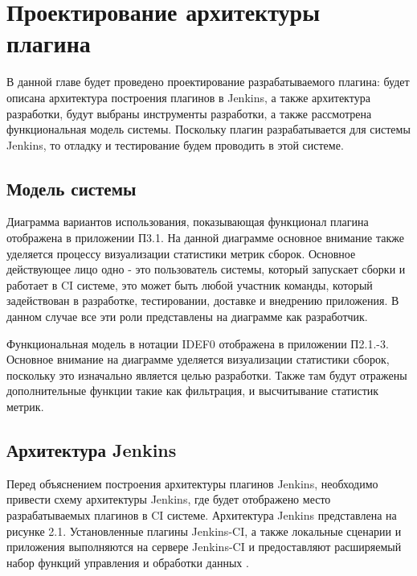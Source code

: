 \chapter{Проектирование архитектуры плагина} \label{ch2}
	
В данной главе будет проведено проектирование разрабатываемого плагина: будет описана архитектура построения плагинов в Jenkins, а также архитектура разработки, будут выбраны инструменты разработки, а также рассмотрена функциональная модель системы. Поскольку плагин разрабатывается для системы Jenkins, то отладку и тестирование будем проводить в этой системе.

\section{Модель системы} \label{ch1:sec1}

Диаграмма вариантов использования, показывающая функционал плагина отображена в приложении П3.1. На данной диаграмме основное внимание также уделяется процессу визуализации статистики метрик сборок. Основное действующее лицо одно - это пользователь системы, который запускает сборки и работает в CI системе, это может быть любой участник команды, который задействован в разработке, тестировании, доставке и внедрению приложения. В данном случае все эти роли представлены на диаграмме как разработчик.

Функциональная модель в нотации IDEF0 отображена в приложении П2.1.-3. Основное внимание на диаграмме уделяется визуализации статистики сборок, поскольку это изначально является целью разработки. Также там будут отражены дополнительные функции такие как фильтрация, и высчитывание статистик метрик.

\section{Архитектура Jenkins} \label{ch1:sec2}

Перед объяснением построения архитектуры плагинов Jenkins, необходимо привести схему архитектуры Jenkins, где будет отображено место разрабатываемых плагинов в CI системе. Архитектура Jenkins представлена на рисунке 2.1. Установленные плагины Jenkins-CI, а также локальные сценарии и приложения выполняются на сервере Jenkins-CI и предоставляют расширяемый набор функций управления и обработки данных \cite{article}.

